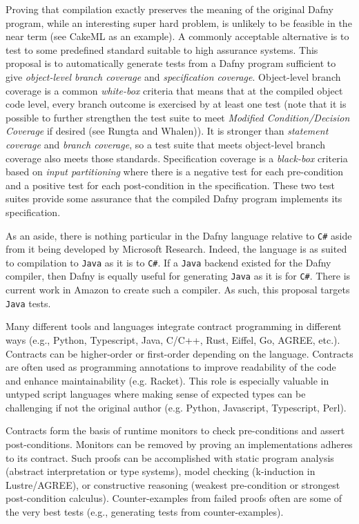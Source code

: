 \documentclass[11pt,onecolumn,notitlepage]{article}
\begin{document}
Proving that compilation exactly preserves the meaning of the original Dafny program, while an interesting super hard problem, is unlikely to be feasible in the near term (see CakeML as an example). A commonly acceptable alternative is to test to some predefined standard suitable to high assurance systems. This proposal is to automatically generate tests from a Dafny program sufficient to give \emph{object-level branch coverage} and \emph{specification coverage}. Object-level branch coverage is a common \emph{white-box} criteria that means that at the compiled object code level, every branch outcome is exercised by at least one test (note that it is possible to further strengthen the test suite to meet \emph{Modified Condition/Decision Coverage} if desired (see Rungta and Whalen)). It is stronger than \emph{statement coverage} and \emph{branch coverage}, so a test suite that meets object-level branch coverage also meets those standards. Specification coverage is a \emph{black-box} criteria based on \emph{input partitioning} where there is a negative test for each pre-condition and a positive test for each post-condition in the specification. These two test suites provide some assurance that the compiled Dafny program implements its specification.

As an aside, there is nothing particular in the Dafny language relative to \texttt{C\#} aside from it being developed by Microsoft Research. Indeed, the language is as suited to compilation to \texttt{Java} as it is to \texttt{C\#}. If a \texttt{Java} backend existed for the Dafny compiler, then Dafny is equally useful for generating \texttt{Java} as it is for \texttt{C\#}. There is current work in Amazon to create such a compiler. As such, this proposal targets \texttt{Java} tests.

Many different tools and languages integrate contract programming in different ways (e.g., Python, Typescript, Java, C/C++, Rust, Eiffel, Go, AGREE, etc.). Contracts can be higher-order or first-order depending on the language. Contracts are often used as programming annotations to improve readability of the code and enhance maintainability (e.g. Racket). This role is especially valuable in untyped script languages where making sense of expected types can be challenging if not the original author (e.g. Python, Javascript, Typescript, Perl). 

Contracts form the basis of runtime monitors to check pre-conditions and assert post-conditions. Monitors can be removed by proving an implementations adheres to its contract. Such proofs can be accomplished with static program analysis (abstract interpretation or type systems), model checking (k-induction in Lustre/AGREE), or constructive reasoning (weakest pre-condition or strongest post-condition calculus). Counter-examples from failed proofs often are some of the very best tests (e.g., generating tests from counter-examples).
\end{document}

